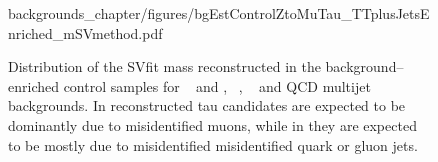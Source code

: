 \begin{figure}
\begin{center}
{  {backgrounds_chapter/figures/bgEstControlZtoMuTau_TTplusJetsEnriched_mSVmethod.pdf}
  \label{fig:becrTTpJ_mSVmethod}
  }
\caption[SVfit mass distribution of the backgrounds in the signal and control
regions]{\captiontext 
	 Distribution of the SVfit mass reconstructed
         in the background--enriched control samples for 
         \ZMM~ and
         ,
         \WpJets~,
         \ttbarpJets~ and QCD
         multijet~ backgrounds.
         In  reconstructed tau candidates are expected to be dominantly due to misidentified muons,
         while in  they are expected to be mostly due to misidentified misidentified quark or gluon jets.}
\label{fig:SVfitMassMuTauBgControlRegions}
\end{center}
\end{figure} 
